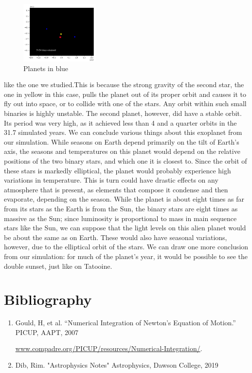 \documentclass[12pt]{article}
\begin{document}
\begin{figure} 
    \centering
    \includegraphics[width=0.35\textwidth]{report/images/binaryejected}
    \caption{Planets in blue}
\end{figure}
like the one we studied.This is because the strong gravity of the second star, the one in yellow in this case, pulls the planet out of its proper orbit and causes it to fly out into space, or to collide with one of the stars. Any orbit within such small binaries is highly unstable. The second planet, however, did have a stable orbit. Its period was very high, as it achieved less than 4 and a quarter orbits in the 31.7 simulated years. We can conclude various things about this exoplanet from our simulation. While seasons on Earth depend primarily on the tilt of Earth's axis, the seasons and temperatures on this planet would depend on the relative positions of the two binary stars, and which one it is closest to. Since the orbit of these stars is markedly elliptical, the planet would probably experience high variations in temperature. This is turn could have drastic effects on any atmosphere that is present, as elements that compose it condense and then evaporate, depending on the season. While the planet is about eight times as far from its stars as the Earth is from the Sun, the binary stars are eight times as massive as the Sun; since luminosity is proportional to mass in main sequence stars like the Sun, we can suppose that the light levels on this alien planet would be about the same as on Earth. These would also have seasonal variations, however, due to the elliptical orbit of the stars. We can draw one more conclusion from our simulation: for much of the planet's year, it would be possible to see the double sunset, just like on Tatooine.
\section{Bibliography}
\begin{enumerate}
    \item Gould, H, et al. “Numerical Integration of Newton's Equation of Motion.” PICUP, AAPT, 2007 
    
    \url{www.compadre.org/PICUP/resources/Numerical-Integration/}.

    \item Dib, Rim. "Astrophysics Notes" Astrophysics, Dawson College, 2019
\end{enumerate}
\end{document}
